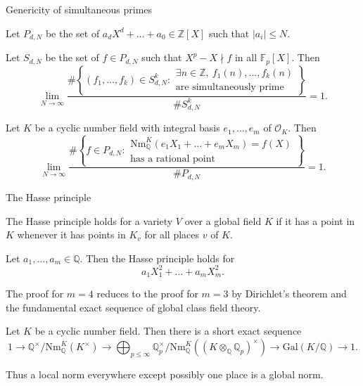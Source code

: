 \documentclass[10pt]{beamer}
\begin{document}
\begin{frame}[t]{Genericity of simultaneous primes}

Let $ P_{d, N} $ be the set of $ a_dX^d + \dots + a_0 \in \mathbb{Z}[X] $ such that $ |a_i| \le N $.

\pause

\begin{theorem}
Let $ S_{d, N} $ be the set of $ f \in P_{d, N} $ such that $ X^p - X \nmid f $ in all $ \mathbb{F}_p[X] $. Then
$$ \lim_{N \to \infty} \dfrac{\#\left\{(f_1, \dots, f_k) \in S_{d, N}^k : \begin{array}{c} \exists n \in \mathbb{Z}, \ f_1(n), \dots, f_k(n) \\ \text{are simultaneously prime} \end{array}\right\}}{\#S_{d, N}^k} = 1. $$
\end{theorem}

\pause

\begin{theorem}
Let $ K $ be a cyclic number field with integral basis $ e_1, \dots, e_m $ of $ \mathcal{O}_K $. Then
$$ \lim_{N \to \infty} \dfrac{\#\left\{f \in P_{d, N} : \begin{array}{c} \mathrm{Nm}_\mathbb{Q}^K(e_1X_1 + \dots + e_mX_m) = f(X) \\ \text{has a rational point} \end{array}\right\}}{\#P_{d, N}} = 1. $$
\end{theorem}

\end{frame}

\begin{frame}[t]{The Hasse principle}

The Hasse principle holds for a variety $ V $ over a global field $ K $ if it has a point in $ K $ whenever it has points in $ K_v $ for all places $ v $ of $ K $.

\pause

\begin{theorem}
Let $ a_1, \dots, a_m \in \mathbb{Q} $. Then the Hasse principle holds for
$$ a_1X_1^2 + \dots + a_mX_m^2. $$
\end{theorem}

\pause

The proof for $ m = 4 $ reduces to the proof for $ m = 3 $ by Dirichlet's theorem and the fundamental exact sequence of global class field theory.

\pause

\begin{theorem}
Let $ K $ be a cyclic number field. Then there is a short exact sequence
$$ 1 \to \mathbb{Q}^\times / \mathrm{Nm}_\mathbb{Q}^K(K^\times) \to \bigoplus_{p \le \infty} \mathbb{Q}_p^\times / \mathrm{Nm}_\mathbb{Q}^K((K \otimes_\mathbb{Q} \mathbb{Q}_p)^\times) \to \mathrm{Gal}(K / \mathbb{Q}) \to 1. $$
\end{theorem}

\pause

Thus a local norm everywhere except possibly one place is a global norm.

\end{frame}
\end{document}
